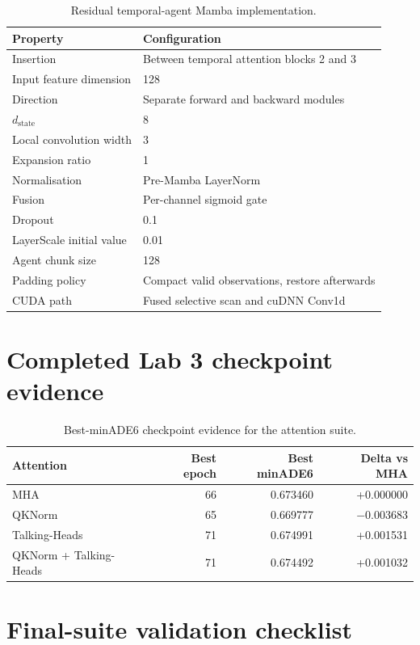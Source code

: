 \begin{table}[htbp]
\centering
\caption{Residual temporal-agent Mamba implementation.}
\label{tab:appendix-mamba}
\begin{tabular}{ll}
\hline
Property & Configuration \\
\hline
Insertion & Between temporal attention blocks 2 and 3 \\
Input feature dimension & 128 \\
Direction & Separate forward and backward modules \\
$d_{\mathrm{state}}$ & 8 \\
Local convolution width & 3 \\
Expansion ratio & 1 \\
Normalisation & Pre-Mamba LayerNorm \\
Fusion & Per-channel sigmoid gate \\
Dropout & 0.1 \\
LayerScale initial value & 0.01 \\
Agent chunk size & 128 \\
Padding policy & Compact valid observations, restore afterwards \\
CUDA path & Fused selective scan and cuDNN Conv1d \\
\hline
\end{tabular}
\end{table}

\section{Completed Lab 3 checkpoint evidence}

\begin{table}[htbp]
\centering
\caption{Best-minADE6 checkpoint evidence for the attention suite.}
\label{tab:appendix-attention}
\begin{tabular}{lrrr}
\hline
Attention & Best epoch & Best minADE6 & Delta vs MHA \\
\hline
MHA & 66 & 0.673460 & +0.000000 \\
QKNorm & 65 & 0.669777 & $-$0.003683 \\
Talking-Heads & 71 & 0.674991 & +0.001531 \\
QKNorm + Talking-Heads & 71 & 0.674492 & +0.001032 \\
\hline
\end{tabular}
\end{table}

\section{Final-suite validation checklist}

